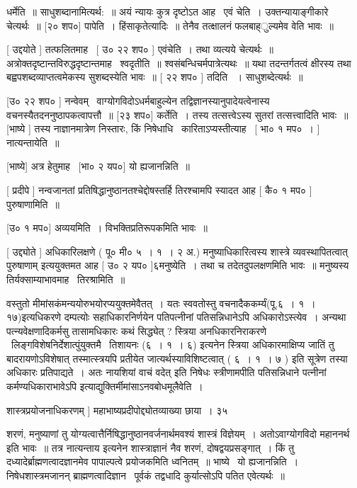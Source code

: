\documentclass[11pt, openany]{book}
\begin{document}
धर्मेति~॥ साधुशब्दानामित्यर्थ:~॥ अयं न्यायः कुत्र दृष्टोऽत आह \textendash\ एवं
चेति~। उक्तन्यायाङ्गीकारे चेत्यर्थः~॥ [२० शप०] पापेति~। 
हिंसाकृतेत्यादिः~॥ तेनैव तत्क्षालनं फलबाह्ुल्यमेव वेति भावः~॥ 

 [ उद्दयोते ] तत्फलितमाह \textendash\ [ उ० २२ शप० ] एवंचेति~। तथा
व्यत्यये चेत्यर्थः~॥
अत्रोक्तदृष्टान्तविरुद्धदृष्टान्तमाह \textendash\ श्वदृतीति~॥
श्वसंबन्धिचर्मपात्रेत्यथः~॥ यथा तदन्तर्गतत्वं क्षीरस्य तथा
बह्वपशब्दव्याप्तत्वमेकस्य सुशब्दस्येति भावः~॥ [ २२ शप० ] तदिति
~। साधुशब्देत्यर्थः~॥ 

 [उ० २२ शप० ] नन्वेवम् \textendash\ वाग्योगविदोऽधर्मबाहुल्येन
तद्विज्ञानस्यानुपादेयत्वेनास्य वचनस्यैतदननुष्ठापकत्वापत्तौ~॥ [२३
शप०] कर्तेति~। तस्य तत्सत्त्वेऽस्य सुतरां तत्सत्त्वादिति भावः~॥
[भाष्ये ] तस्य नाज्ञानमात्रेण निस्तारः, किं निषेधाधि \textendash\ 
कारिताऽप्यस्तीत्याह \textendash\ [ भा० १ मप०~। ] नात्यन्तायेति~॥ 

 [भाष्ये] अत्र हेतुमाह \textendash\ [भा० २ यप०] यो ह्यजानन्निति~॥ 

 [ प्रदीपे ] नन्वजानतां प्रतिषिद्धानुष्ठानतश्चेद्दोषस्तर्हि
तिरश्चामपि स्यादत आह [ कै० १ मप० ] पुरुषाणामिति~॥ 

 [उ० १ मप०] अव्ययमिति~। विभक्तिप्रतिरूपकमिति भावः~॥ 

 [ उद्द्योते ] अधिकारिलक्षणे ( पू० मी० ५~। १~। २ अ.)
मनुष्याधिकारित्वस्य शास्त्रे व्यवस्थापितत्वात् {\qt पुरुषाणाम्} इत्ययुक्तमत
आह [ उ० २ यप० ]६मनुष्येति~। तथा च तदेतदुपलक्षणमिति भावः~॥ मनुष्यस्य
तिर्यक्साम्याभावमाह \textendash\ तिरश्रामिति~॥ 



वस्तुतो मीमांसकंमन्ययोरुभयोरप्ययुक्तमेवैतत्~। यतः {\qt स्ववतोस्तु}
वचनादैककर्म्यं(पू.६~। १~। १७)इत्यधिकरणे दम्पत्योः सहाधिकारनिर्णयेन
पतिपत्नीनां पतिसन्निधानेऽपि अधिकारोऽस्त्येव~। अन्यथा
पत्न्यवेक्षणादिकर्मसु तासामधिकारः कथं सिद्ध्येत् ? स्त्रिया
अनधिकारनिराकरणे \textendash\ {\qt लिङ्गविशेषनिर्देशात्पुंयुक्तमै \textendash\ तिशायनः} (६~। १~। ६) इत्यनेन
स्त्रिया अधिकारमाक्षिप्य {\qt जातिं तु बादरायणोऽविशेषात् तस्मात्स्त्रयपि
प्रतीयेत जात्यर्थस्याविशिष्टत्वात्} ( ६~। १~। ७ ) इति सूत्रेण तस्या अधिकारः
प्रतिपाद्यते~। अतः {\qt नायशियां वाचं वदेत्} इति निषेधः स्त्रीणामपीति
पतिसन्निधाने पत्नीनां कर्मण्यधिकाराभावेऽपि
इत्याद्युक्तिर्मीमांसाऽनवबोधमूलैवेति~। 

शास्त्रप्रयोजनाधिकरणम् ] महाभाष्यप्रदीपोद्द्योतव्याख्या छाया~। ३५



शरणं, मनुष्याणां तु योग्यत्वात्तैर्निषिद्धानुष्ठानवर्जनार्थमवश्यं
शास्त्रं विज्ञेयम्~। अतोऽवाग्योगविदो महाननर्थ इति भावः~॥ तत्र
{\qt नात्यन्ताय} इत्यनेन शास्त्राज्ञानं नैव शरणं, दोषद्वयप्रसङ्गात्~। किं तु
दध्यादेर्ब्राह्मणत्वादज्ञानमेव पापाल्पत्वे प्रयोजकमिति ध्वनितम्~॥
भाष्ये \textendash\ यो ह्यजानन्निति~। निषेधशास्त्रमजानन् ब्राह्मणत्वादिज्ञान \textendash\ पूर्वकं
तद्वधादि कुर्यात्सोऽपि पतित एवेत्यर्थः~॥ 
\end{document}
